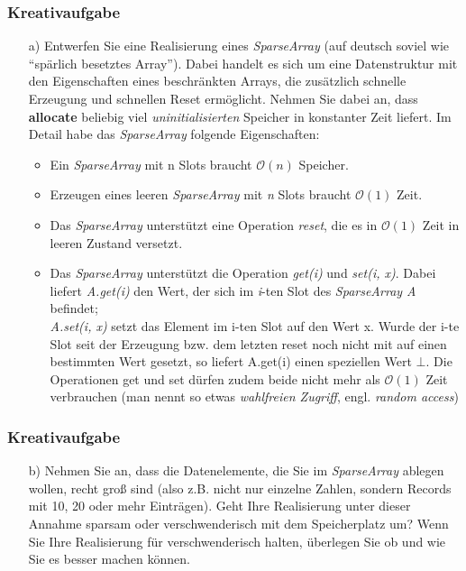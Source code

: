 \begin{frame}
	\frametitle{Kreativaufgabe}

	\begin{itemize}
		\item[a)] Entwerfen Sie eine Realisierung eines \textit{SparseArray} (auf deutsch soviel wie "`spärlich besetztes Array"'). Dabei handelt es sich um eine Datenstruktur mit 
			den Eigenschaften eines beschränkten Arrays, die zusätzlich schnelle Erzeugung und schnellen Reset ermöglicht.
			Nehmen Sie dabei an, dass \textbf{allocate} beliebig viel \textit{uninitialisierten} Speicher in konstanter Zeit liefert. Im Detail habe das \textit{SparseArray} folgende Eigenschaften:
		\begin{itemize}
			\item Ein \textit{SparseArray} mit n Slots braucht $\mathcal{O}(n)$ Speicher.
			\item Erzeugen eines leeren \textit{SparseArray} mit \textit{n} Slots braucht $\mathcal{O}(1)$ Zeit.
			\item Das \textit{SparseArray} unterstützt eine Operation \textit{reset}, die es in $\mathcal{O}(1)$ Zeit in leeren Zustand versetzt.
			\item Das \textit{SparseArray} unterstützt die Operation \textit{get(i)} und \textit{set(i, x)}. Dabei liefert \textit{A.get(i)} den Wert, der sich im \textit{i}-ten Slot des \textit{SparseArray A} befindet;\\
				\textit{A.set(i, x)} setzt das Element im i-ten Slot auf den Wert x. Wurde der i-te Slot seit der Erzeugung bzw. dem letzten reset noch nicht mit auf einen 
				bestimmten Wert gesetzt, so liefert A.get(i) einen speziellen Wert $\bot$. Die Operationen get und set dürfen zudem beide nicht mehr als $\mathcal{O}(1)$ Zeit verbrauchen (man nennt so etwas \textit{wahlfreien 	
				Zugriff}, engl. \textit{random access})
		\end{itemize}
	\end{itemize}

\end{frame}

\begin{frame}
	\frametitle{Kreativaufgabe}

	\begin{itemize}
		\item[b)] Nehmen Sie an, dass die Datenelemente, die Sie im \textit{SparseArray} ablegen wollen, recht groß sind (also z.B. nicht nur einzelne Zahlen, sondern Records mit 10, 20 oder mehr Einträgen).
			Geht Ihre Realisierung unter dieser Annahme sparsam oder verschwenderisch mit dem Speicherplatz um? Wenn Sie Ihre Realisierung für verschwenderisch halten, überlegen Sie
			ob und wie Sie es besser machen können.
	\end{itemize}

\end{frame}

